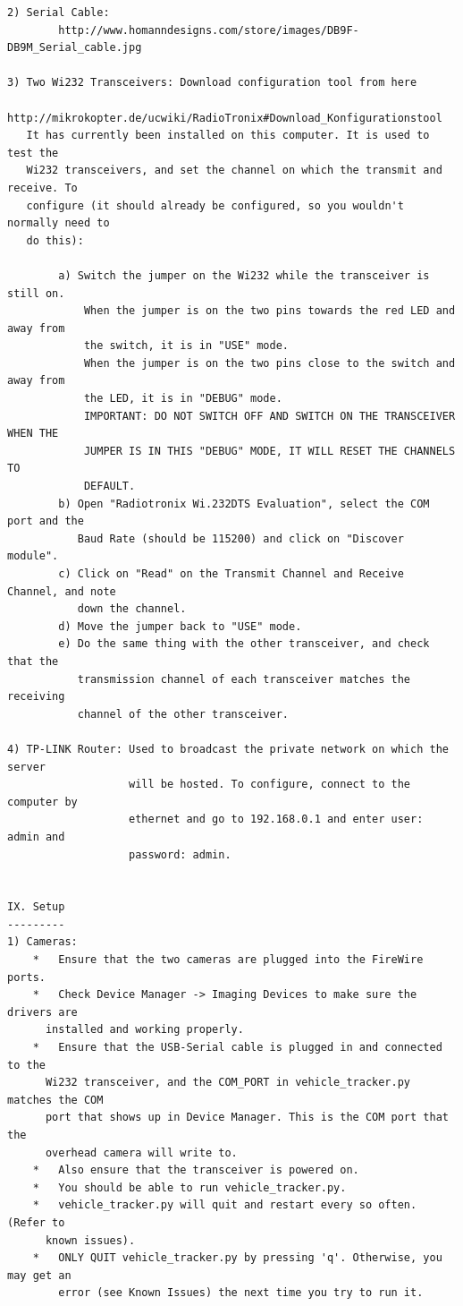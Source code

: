 \documentclass[english]{article}\usepackage[]{graphicx}\usepackage[]{color}
\begin{document}
\begin{appendix}
\begin{verbatim}
2) Serial Cable:
		http://www.homanndesigns.com/store/images/DB9F-DB9M_Serial_cable.jpg

3) Two Wi232 Transceivers: Download configuration tool from here
		http://mikrokopter.de/ucwiki/RadioTronix#Download_Konfigurationstool
   It has currently been installed on this computer. It is used to test the 
   Wi232 transceivers, and set the channel on which the transmit and receive. To
   configure (it should already be configured, so you wouldn't normally need to
   do this):

   		a) Switch the jumper on the Wi232 while the transceiver is still on.
   			When the jumper is on the two pins towards the red LED and away from
   			the switch, it is in "USE" mode.
   			When the jumper is on the two pins close to the switch and away from
   			the LED, it is in "DEBUG" mode.
   			IMPORTANT: DO NOT SWITCH OFF AND SWITCH ON THE TRANSCEIVER WHEN THE
   			JUMPER IS IN THIS "DEBUG" MODE, IT WILL RESET THE CHANNELS TO
   			DEFAULT.
   		b) Open "Radiotronix Wi.232DTS Evaluation", select the COM port and the
   		   Baud Rate (should be 115200) and click on "Discover module".
   		c) Click on "Read" on the Transmit Channel and Receive Channel, and note
   		   down the channel.
   		d) Move the jumper back to "USE" mode.
   		e) Do the same thing with the other transceiver, and check that the
   		   transmission channel of each transceiver matches the receiving
   		   channel of the other transceiver.

4) TP-LINK Router: Used to broadcast the private network on which the server
				   will be hosted. To configure, connect to the computer by
				   ethernet and go to 192.168.0.1 and enter user: admin and
				   password: admin.


IX. Setup
---------
1) Cameras:
	*   Ensure that the two cameras are plugged into the FireWire ports.
	*   Check Device Manager -> Imaging Devices to make sure the drivers are
	  installed and working properly.
	*   Ensure that the USB-Serial cable is plugged in and connected to the
	  Wi232 transceiver, and the COM_PORT in vehicle_tracker.py matches the COM
	  port that shows up in Device Manager. This is the COM port that the
	  overhead camera will write to.
	*   Also ensure that the transceiver is powered on.
	*   You should be able to run vehicle_tracker.py.
	*   vehicle_tracker.py will quit and restart every so often. (Refer to 
	  known issues).
	*	ONLY QUIT vehicle_tracker.py by pressing 'q'. Otherwise, you may get an
		error (see Known Issues) the next time you try to run it.


\end{verbatim}
\end{appendix}
\end{document}
